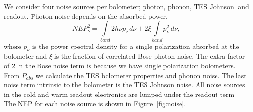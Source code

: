 \documentclass[]{spie}  %
\newcommand{\comr}[1]{\textcolor{red}{#1}}
\begin{document}

We consider four noise sources per bolometer; photon, phonon, TES Johnson, and readout. 
Photon noise depends on the absorbed power\cite{richards1994}, 
\begin{equation}
\label{eq:photon}
NEP_{\gamma}^2 = \int\limits_{band} 2h\nu p_{\nu} \, d\nu + 2\xi \int\limits_{band} p_{\nu}^2 \,  d\nu,
\end{equation} 
where $p_{\nu}$ is the power spectral density for a single polarization absorbed at the bolometer and $\xi$ is the fraction of correlated Bose 
photon noise. The extra factor of 2 in the Bose noise term is because we have single polarization bolometers.  
%
%
From $P_{abs}$ we calculate the TES bolometer properties and phonon noise.\cite{mather1982}  
The last noise term intrinsic to the bolometer is the TES Johnson noise. All noise sources in the cold and warm readout 
electronics are lumped under the readout term.  The NEP for each noise source is shown in Figure~\ref{fig:noise}.


\end{document}
